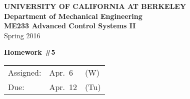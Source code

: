 \documentclass[letterpaper,12pt]{article}
\begin{document}
\begin{center}
    {\bf UNIVERSITY OF CALIFORNIA AT BERKELEY}\\
    {\bf Department of Mechanical Engineering}\\
    {\bf ME233 Advanced Control Systems II}\\
    Spring 2016\\
\end{center}
\noindent
{\Large \bf Homework \#5 }\\[-3em]
\begin{flushright}
\begin{tabular} {lll}
    Assigned: &  Apr.\ 6 & (W) \\
    Due: & Apr.\ 12 & (Tu)
\end{tabular}
\end{flushright}


\begin{enumerate}


\newpage

%

\end{enumerate}
\end{document}
